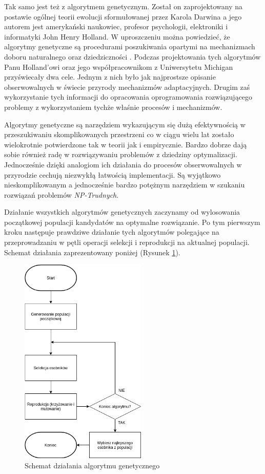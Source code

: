 \documentclass[12pt, oneside, a4paper]{report}
\begin{document}
Tak samo jest też z algorytmem genetycznym. Został on zaprojektowany na postawie ogólnej teorii ewolucji sformułowanej przez Karola Darwina a jego autorem jest amerykański naukowiec, profesor psychologii, elektroniki i informatyki John Henry Holland. W uproszczeniu można powiedzieć, że algorytmy genetyczne są procedurami poszukiwania opartymi na mechanizmach doboru naturalnego oraz dziedziczności \citep{goldberg1995algorytmygenetyczne}. Podczas projektowania tych algorytmów Panu Holland'owi oraz jego współpracownikom z Uniwersytetu Michigan przyświecały dwa cele. Jednym z nich było jak najprostsze opisanie obserwowalnych w świecie przyrody mechanizmów adaptacyjnych. Drugim zaś wykorzystanie tych informacji do opracowania oprogramowania rozwiązującego problemy z wykorzystaniem tychże właśnie procesów i mechanizmów.

Algorytmy genetyczne są narzędziem wykazującym się dużą efektywnością w przeszukiwaniu skomplikowanych przestrzeni co w ciągu wielu lat zostało wielokrotnie potwierdzone tak w teorii jak i empirycznie. Bardzo dobrze dają sobie również radę w rozwiązywaniu problemów z dziedziny optymalizacji. Jednocześnie dzięki analogiom ich działania do procesów obserwowalnych w przyrodzie cechują niezwykłą łatwością implementacji. Są wyjątkowo nieskomplikowanym a jednocześnie bardzo potężnym narzędziem w szukaniu rozwiązań problemów \textit{NP-Trudnych}.

Działanie wszystkich algorytmów genetycznych zaczynamy od wylosowania początkowej populacji kandydatów na optymalne rozwiązanie. Po tym pierwszym kroku następuje prawdziwe działanie tych algorytmów polegające na przeprowadzaniu w pętli operacji selekcji i reprodukcji na aktualnej populacji. Schemat działania zaprezentowany poniżej (Rysunek \ref{fig: 3.1}).

\begin{figure}[h]
	\centering
	\includegraphics[width=6cm]{fig31.png}
	\caption{Schemat działania algorytmu genetycznego}
	\label{fig: 3.1}
\end{figure}
\end{document}
